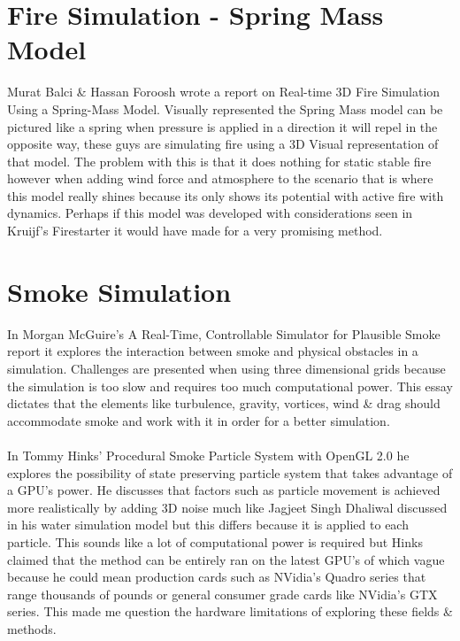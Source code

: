 \documentclass[article, 10pt]{article}
\begin{document}
\section{Fire Simulation - Spring Mass Model}
Murat Balci \& Hassan Foroosh wrote a report on Real-time 3D Fire Simulation Using a Spring-Mass Model. \cite{balci} Visually represented the Spring Mass model can be pictured like a spring when pressure is applied in a direction it will repel in the opposite way, these guys are simulating fire using a 3D Visual representation of that model. The problem with this is that it does nothing for static stable fire however when adding wind force and atmosphere to the scenario that is where this model really shines because its only shows its potential with active fire with dynamics. Perhaps if this model was developed with considerations seen in Kruijf's Firestarter\cite{dekruijf} it would have made for a very promising method.

\section{Smoke Simulation}
In Morgan McGuire's A Real-Time, Controllable Simulator for Plausible Smoke \cite{mcguire2006} report it explores the interaction between smoke and physical obstacles in a simulation. Challenges are presented when using three dimensional grids because the simulation is too slow and requires too much computational power. This essay dictates that the elements like turbulence, gravity, vortices, wind \& drag should accommodate smoke and work with it in order for a better simulation.
\\
\\
In Tommy Hinks' Procedural Smoke Particle System with OpenGL 2.0\cite{hinks} he explores the possibility of state preserving particle system that takes advantage of a GPU's power. He discusses that factors such as particle movement is achieved more realistically by adding 3D noise much like Jagjeet Singh Dhaliwal discussed in his water simulation model but this differs because it is applied to each particle. This sounds like a lot of computational power is required but Hinks claimed that the method can be entirely ran on the latest GPU's of which vague because he could mean production cards such as NVidia's Quadro series that range thousands of pounds or general consumer grade cards like NVidia's GTX series. This made me question the hardware limitations of exploring these fields \& methods.
\end{document}
